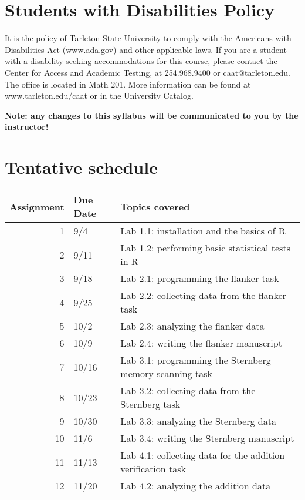 \documentclass[10pt]{article}
\begin{document}
\section*{Students with Disabilities Policy}
\label{sec:orgb5a171d}

It is the policy of Tarleton State University to comply with the Americans with Disabilities  Act (www.ada.gov) and other applicable laws.  If you are a student with a disability seeking accommodations for this course, please contact the Center for Access and Academic Testing, at 254.968.9400 or caat@tarleton.edu. The office is located in Math 201. More information can be found at www.tarleton.edu/caat or in the University Catalog.​

\textbf{Note:  any changes to this syllabus will be communicated to you by the instructor!}

\section*{Tentative schedule}
\label{sec:orga647cc5}

\begin{center}
\begin{tabular}{rll}
Assignment & Due Date & Topics covered\\
\hline
1 & 9/4 & Lab 1.1: installation and the basics of R\\
2 & 9/11 & Lab 1.2: performing basic statistical tests in R\\
3 & 9/18 & Lab 2.1: programming the flanker task\\
4 & 9/25 & Lab 2.2: collecting data from the flanker task\\
5 & 10/2 & Lab 2.3: analyzing the flanker data\\
6 & 10/9 & Lab 2.4: writing the flanker manuscript\\
7 & 10/16 & Lab 3.1: programming the Sternberg memory scanning task\\
8 & 10/23 & Lab 3.2: collecting data from the Sternberg task\\
9 & 10/30 & Lab 3.3: analyzing the Sternberg data\\
10 & 11/6 & Lab 3.4: writing the Sternberg manuscript\\
11 & 11/13 & Lab 4.1: collecting data for the addition verification task\\
12 & 11/20 & Lab 4.2: analyzing the addition data\\
\end{tabular}
\end{center}
\end{document}
